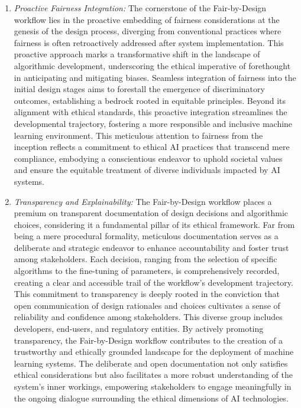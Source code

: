\documentclass[12pt,a4paper,openright,twoside]{book}
\begin{document}
\begin{enumerate}

    \item \emph{Proactive Fairness Integration:} The cornerstone of the Fair-by-Design workflow lies in the proactive embedding of fairness considerations at the genesis of the design process, diverging from conventional practices where fairness is often retroactively addressed after system implementation. This proactive approach marks a transformative shift in the landscape of algorithmic development, underscoring the ethical imperative of forethought in anticipating and mitigating biases. Seamless integration of fairness into the initial design stages aims to forestall the emergence of discriminatory outcomes, establishing a bedrock rooted in equitable principles. Beyond its alignment with ethical standards, this proactive integration streamlines the developmental trajectory, fostering a more responsible and inclusive machine learning environment. This meticulous attention to fairness from the inception reflects a commitment to ethical AI practices that transcend mere compliance, embodying a conscientious endeavor to uphold societal values and ensure the equitable treatment of diverse individuals impacted by AI systems.

    \item \emph{Transparency and Explainability:} The Fair-by-Design workflow places a premium on transparent documentation of design decisions and algorithmic choices, considering it a fundamental pillar of its ethical framework. Far from being a mere procedural formality, meticulous documentation serves as a deliberate and strategic endeavor to enhance accountability and foster trust among stakeholders. Each decision, ranging from the selection of specific algorithms to the fine-tuning of parameters, is comprehensively recorded, creating a clear and accessible trail of the workflow's development trajectory. This commitment to transparency is deeply rooted in the conviction that open communication of design rationales and choices cultivates a sense of reliability and confidence among stakeholders. This diverse group includes developers, end-users, and regulatory entities. By actively promoting transparency, the Fair-by-Design workflow contributes to the creation of a trustworthy and ethically grounded landscape for the deployment of machine learning systems. The deliberate and open documentation not only satisfies ethical considerations but also facilitates a more robust understanding of the system's inner workings, empowering stakeholders to engage meaningfully in the ongoing dialogue surrounding the ethical dimensions of AI technologies.


\end{enumerate}
\end{document}
